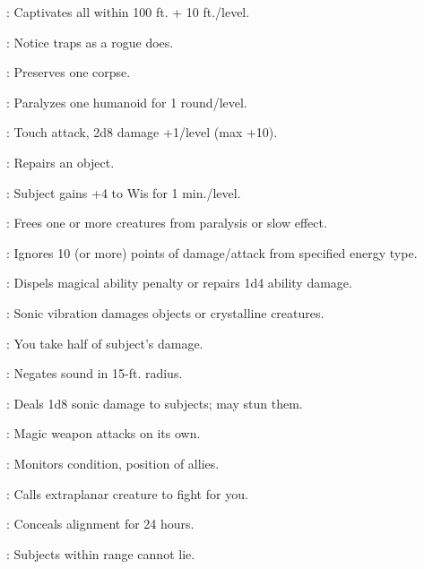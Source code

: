 \begin{multicols}{2}
\begin{description*}
\item[\linkspell{Enthrall}:] Captivates all within 100 ft. + 10 ft./level.
\item[\linkspell{Find Traps}:] Notice traps as a rogue does.
\item[\linkspell{Gentle Repose}:] Preserves one corpse.
\item[\linkspell{Hold Person}:] Paralyzes one humanoid for 1 round/level.
\item[\linkspell{Inflict Moderate Wounds}:] Touch attack, 2d8 damage +1/level (max +10).
\item[\linkspell{Make Whole}:] Repairs an object.
\item[\linkspell{Owl’s Wisdom}:] Subject gains +4 to Wis for 1 min./level.
\item[\linkspell{Remove Paralysis}:] Frees one or more creatures from paralysis or slow effect.
\item[\linkspell{Resist Energy}:] Ignores 10 (or more) points of damage/attack from specified energy type.
\item[\linkspell{Restoration, Lesser}:] Dispels magical ability penalty or repairs 1d4 ability damage.
\item[\linkspell{Shatter}:] Sonic vibration damages objects or crystalline creatures.
\item[\linkspell{Shield Other}:] You take half of subject’s damage.
\item[\linkspell{Silence}:] Negates sound in 15-ft. radius.
\item[\linkspell{Sound Burst}:] Deals 1d8 sonic damage to subjects; may stun them.
\item[\linkspell{Spiritual Weapon}:] Magic weapon attacks on its own.
\item[\linkspell{Status}:] Monitors condition, position of allies.
\item[\linkspell{Summon Monster II}:] Calls extraplanar creature to fight for you.
\item[\linkspell{Undetectable Alignment}:] Conceals alignment for 24 hours.
\item[\linkspell{Zone of Truth}:] Subjects within range cannot lie.
\end{description*}


\end{multicols}
